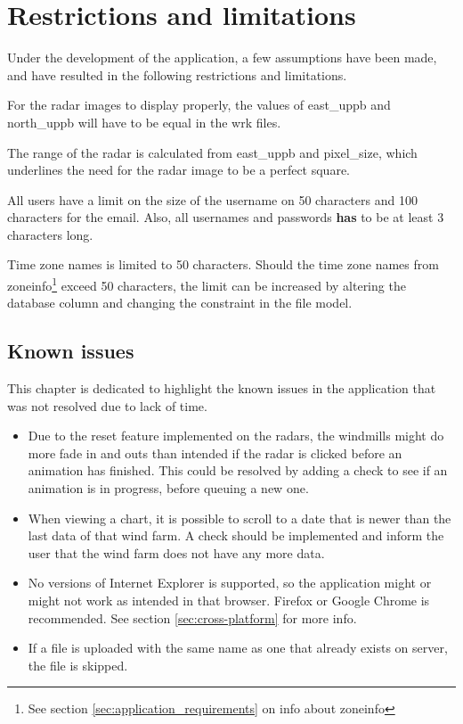 \chapter{Restrictions and limitations}
\label{sec:restrictions_and_limitations}
Under the development of the application, a few assumptions have been made, and have resulted in the following restrictions and limitations.

For the radar images to display properly, the values of \textsf{east\_uppb} and \textsf{north\_uppb} will have to be equal in the \textsf{wrk} files.

The range of the radar is calculated from \textsf{east\_uppb} and \textsf{pixel\_size}, which underlines the need for the radar image to be a perfect square.

All users have a limit on the size of the username on 50 characters and 100 characters for the email.
Also, all usernames and passwords \textbf{has} to be at least 3 characters long.

Time zone names is limited to 50 characters. Should the time zone names from zoneinfo\footnote{See section \ref{sec:application_requirements} on info about zoneinfo} exceed 50 characters, the limit can be increased by altering the database column and changing the constraint in the file model.

\section{Known issues}
\label{sec:known_issues}
This chapter is dedicated to highlight the known issues in the application that was not resolved due to lack of time.
\begin{itemize}
\item Due to the reset feature implemented on the radars, the windmills might do more fade in and outs than intended if the radar is clicked before an animation has finished.
This could be resolved by adding a check to see if an animation is in progress, before queuing a new one.
\item When viewing a chart, it is possible to scroll to a date that is newer than the last data of that wind farm. A check should be implemented and inform the user that the wind farm does not have any more data.
\item No versions of Internet Explorer is supported, so the application might or might not work as intended in that browser. Firefox or Google Chrome is recommended. See section \ref{sec:cross-platform} for more info.
\item If a file is uploaded with the same name as one that already exists on server, the file is skipped.
\end{itemize}